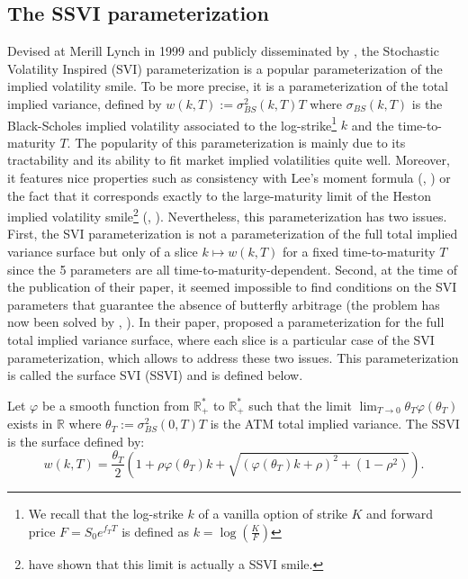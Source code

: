 \subsection{The SSVI parameterization}\label{sec:ssvi}
Devised at Merill Lynch in 1999 and publicly disseminated by \cite{gatheral2004parsimonious}, the Stochastic Volatility Inspired (SVI) parameterization is a popular parameterization of the implied volatility smile. To be more precise, it is a parameterization of the total implied variance, defined by $w(k,T):=\sigma_{BS}^2(k,T)T$ where $\sigma_{BS}(k,T)$ is the Black-Scholes implied volatility associated to the log-strike\footnote{We recall that the log-strike $k$ of a vanilla option of strike $K$ and forward price $F=S_0e^{f_T T}$ is defined as $k = \log \left(\frac{K}{F} \right)$} $k$ and the time-to-maturity $T$. The popularity of this parameterization is mainly due to its tractability and its ability to fit market implied volatilities quite well. Moreover, it features nice properties such as consistency with Lee's moment formula (\citeauthor{lee2004moment}, \citeyear{lee2004moment}) or the fact that it corresponds exactly to the large-maturity limit of the Heston implied volatility smile\footnote{\cite{martini2023refined} have shown that this limit is actually a SSVI smile. } (\citeauthor{gatheral2011convergence}, \citeyear{gatheral2011convergence}). Nevertheless, this parameterization has two issues. First, the SVI parameterization is not a parameterization of the full total implied variance surface but only of a slice $k\mapsto w(k,T)$ for a fixed time-to-maturity $T$ since the 5 parameters are all time-to-maturity-dependent. Second, at the time of the publication of their paper, it seemed impossible to find conditions on the SVI parameters that guarantee the absence of butterfly arbitrage (the problem has now been solved by \citeauthor{martini2022svi}, \citeyear{martini2022svi}). In their paper, \cite{gatheral2014arbitrage} proposed a parameterization for the full total implied variance surface, where each slice is a particular case of the SVI parameterization, which allows to address these two issues. This parameterization is called the surface SVI (SSVI) and is defined below. 
\begin{definition}
    Let $\varphi$ be a smooth function from $\mathbb{R}_+^*$ to $\mathbb{R}_+^*$ such that the limit $\lim_{T\to 0}\theta_T \varphi(\theta_T)$ exists in $\mathbb{R}$ where $\theta_T:=\sigma_{BS}^2(0,T)T$ is the ATM total implied variance. The SSVI is the surface defined by:
    \begin{equation}
        w(k,T) = \frac{\theta_T}{2}\left(1+\rho\varphi(\theta_T)k+\sqrt{(\varphi(\theta_T)k+\rho)^2+(1-\rho^2)} \right).
    \end{equation}  
\end{definition}


